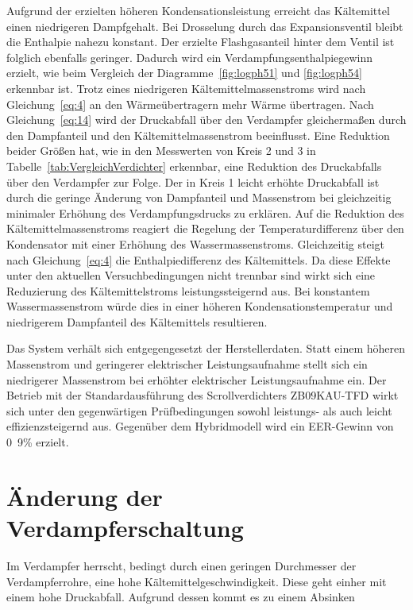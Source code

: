 Aufgrund der erzielten höheren Kondensationsleistung erreicht das Kältemittel einen niedrigeren Dampfgehalt. Bei Drosselung durch das Expansionsventil bleibt die Enthalpie nahezu konstant. Der erzielte Flashgasanteil hinter dem Ventil ist folglich ebenfalls geringer. Dadurch wird ein Verdampfungsenthalpiegewinn erzielt, wie beim Vergleich der Diagramme~\ref{fig:logph51} und \ref{fig:logph54} erkennbar ist. Trotz eines niedrigeren Kältemittelmassenstroms wird nach Gleichung~\ref{eq:4} an den Wärmeübertragern mehr Wärme übertragen. Nach Gleichung~\ref{eq:14} wird der Druckabfall über den Verdampfer gleichermaßen durch den Dampfanteil und den Kältemittelmassenstrom beeinflusst. Eine Reduktion beider Größen hat, wie in den Messwerten von Kreis 2 und 3 in Tabelle~\ref{tab:VergleichVerdichter} erkennbar, eine Reduktion des Druckabfalls über den Verdampfer zur Folge. Der in Kreis 1 leicht erhöhte Druckabfall ist durch die geringe Änderung von Dampfanteil und Massenstrom bei gleichzeitig minimaler Erhöhung des Verdampfungsdrucks zu erklären.
Auf die Reduktion des Kältemittelmassenstroms reagiert die Regelung der Temperaturdifferenz über den Kondensator mit einer Erhöhung des Wassermassenstroms.
Gleichzeitig steigt nach Gleichung~\ref{eq:4} die Enthalpiedifferenz des Kältemittels.
Da diese Effekte unter den aktuellen Versuchbedingungen nicht trennbar sind wirkt sich eine Reduzierung des Kältemittelstroms leistungssteigernd aus.
Bei konstantem Wassermassenstrom würde dies in einer höheren Kondensationstemperatur und niedrigerem Dampfanteil des Kältemittels resultieren.

Das System verhält sich entgegengesetzt der Herstellerdaten. Statt einem höheren Massenstrom und geringerer elektrischer Leistungsaufnahme stellt sich ein niedrigerer Massenstrom bei erhöhter elektrischer Leistungsaufnahme ein.  
Der Betrieb mit der Standardausführung des Scrollverdichters ZB09KAU-TFD wirkt sich unter den gegenwärtigen Prüfbedingungen sowohl leistungs- als auch leicht effizienzsteigernd aus. Gegenüber dem Hybridmodell wird ein EER-Gewinn von \unit{0.9}{\%} erzielt.


\section{Änderung der Verdampferschaltung}
\label{sec:Änderung der Verdampferschaltung}




Im Verdampfer herrscht, bedingt durch einen geringen Durchmesser der Verdampferrohre, eine hohe Kältemittelgeschwindigkeit. Diese geht einher mit einem hohe Druckabfall. Aufgrund dessen kommt es zu einem Absinken


